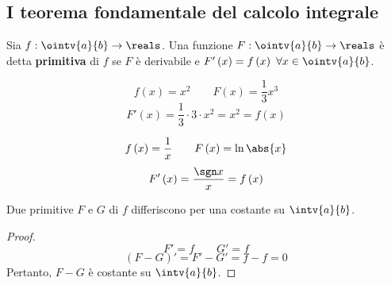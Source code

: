 \subsection{I teorema fondamentale del calcolo integrale}

\begin{definition}[Primitiva]
  Sia $f:\ointv{a}{b}\to\reals$. Una funzione $F:\ointv{a}{b}\to\reals$ è detta \textbf{primitiva} di $f$ se $F$ è derivabile e $F'\left( x \right)=f\left( x \right)\ \forall x\in\ointv{a}{b}$.
\end{definition}

\begin{example}
  $$f\left( x \right)=x^2\qquad F\left( x \right)=\frac{1}{3}x^3$$
  $$F'\left( x \right)=\frac{1}{3}\cdot 3\cdot x^2=x^2=f\left( x \right)$$
\end{example}

\begin{example}
  $$f\left( x \right)=\frac{1}{x}\qquad F\left( x \right)=\ln \abs{x}$$
  $$F'\left( x \right)=\frac{\sgn x}{x}=f\left( x \right)$$
\end{example}

\begin{lemma}
  Due primitive $F$ e $G$ di $f$ differiscono per una costante su $\intv{a}{b}$.
\end{lemma}
\begin{proof}
  $$F'=f\qquad G'=f$$
  $$\left( F-G \right)'=F'-G'=f-f=0$$
  Pertanto, $F-G$ è costante su $\intv{a}{b}$.
\end{proof}

